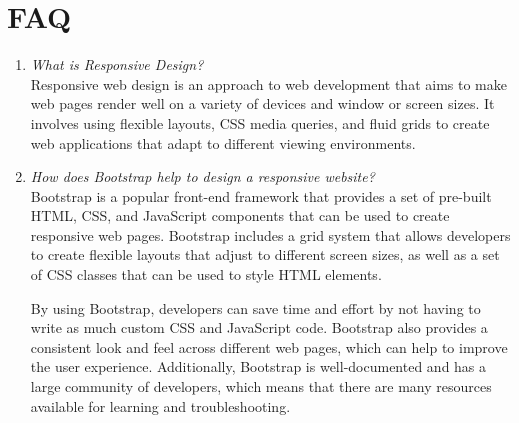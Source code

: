 \documentclass[11pt]{article}
\begin{document}
\section{FAQ}
\begin{enumerate}
    \item \textit{What is Responsive Design?}\\

          Responsive web design is an approach to web development that aims to make web pages render well on a variety of devices and window or screen sizes. It involves using flexible layouts, CSS media queries, and fluid grids to create web applications that adapt to different viewing environments.

    \item \textit{How does Bootstrap help to design a responsive website?}\\

          Bootstrap is a popular front-end framework that provides a set of pre-built HTML, CSS, and JavaScript components that can be used to create responsive web pages. Bootstrap includes a grid system that allows developers to create flexible layouts that adjust to different screen sizes, as well as a set of CSS classes that can be used to style HTML elements.

          By using Bootstrap, developers can save time and effort by not having to write as much custom CSS and JavaScript code. Bootstrap also provides a consistent look and feel across different web pages, which can help to improve the user experience. Additionally, Bootstrap is well-documented and has a large community of developers, which means that there are many resources available for learning and troubleshooting.

\end{enumerate}
\end{document}
